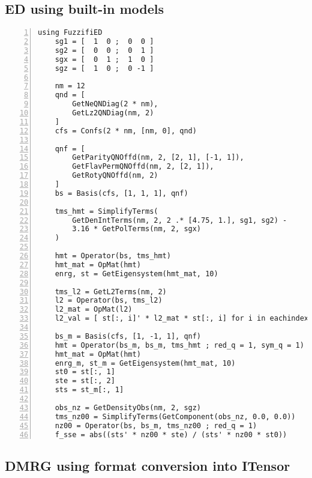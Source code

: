 \documentclass{timesjhep}
\begin{document}
\subsection{ED using built-in models}
\label{app:code_ed2}

\begin{lstlisting}[numbers=left]
    using FuzzifiED
    sg1 = [  1  0 ;  0  0 ]
    sg2 = [  0  0 ;  0  1 ]
    sgx = [  0  1 ;  1  0 ]
    sgz = [  1  0 ;  0 -1 ]

    nm = 12
    qnd = [ 
        GetNeQNDiag(2 * nm), 
        GetLz2QNDiag(nm, 2) 
    ]
    cfs = Confs(2 * nm, [nm, 0], qnd)

    qnf = [ 
        GetParityQNOffd(nm, 2, [2, 1], [-1, 1]), 
        GetFlavPermQNOffd(nm, 2, [2, 1]), 
        GetRotyQNOffd(nm, 2) 
    ]
    bs = Basis(cfs, [1, 1, 1], qnf)

    tms_hmt = SimplifyTerms(
        GetDenIntTerms(nm, 2, 2 .* [4.75, 1.], sg1, sg2) - 
        3.16 * GetPolTerms(nm, 2, sgx) 
    )

    hmt = Operator(bs, tms_hmt)
    hmt_mat = OpMat(hmt)
    enrg, st = GetEigensystem(hmt_mat, 10)

    tms_l2 = GetL2Terms(nm, 2)
    l2 = Operator(bs, tms_l2)
    l2_mat = OpMat(l2)
    l2_val = [ st[:, i]' * l2_mat * st[:, i] for i in eachindex(enrg)]

    bs_m = Basis(cfs, [1, -1, 1], qnf)
    hmt = Operator(bs_m, bs_m, tms_hmt ; red_q = 1, sym_q = 1) 
    hmt_mat = OpMat(hmt)
    enrg_m, st_m = GetEigensystem(hmt_mat, 10)
    st0 = st[:, 1] 
    ste = st[:, 2] 
    sts = st_m[:, 1]

    obs_nz = GetDensityObs(nm, 2, sgz)
    tms_nz00 = SimplifyTerms(GetComponent(obs_nz, 0.0, 0.0))
    nz00 = Operator(bs, bs_m, tms_nz00 ; red_q = 1) 
    f_sse = abs((sts' * nz00 * ste) / (sts' * nz00 * st0))
\end{lstlisting}

\subsection{DMRG using format conversion into ITensor}
\end{document}

